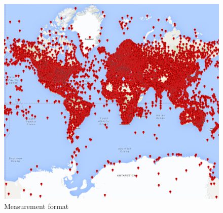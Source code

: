 \documentclass{vldb}
\begin{document}
\begin{figure}[tbh]
\includegraphics[width=1\linewidth]{stations2014}
\caption{Measurement format}
\label{fig:stations2014}
\end{figure}




\clearpage

\balance





\end{document}
